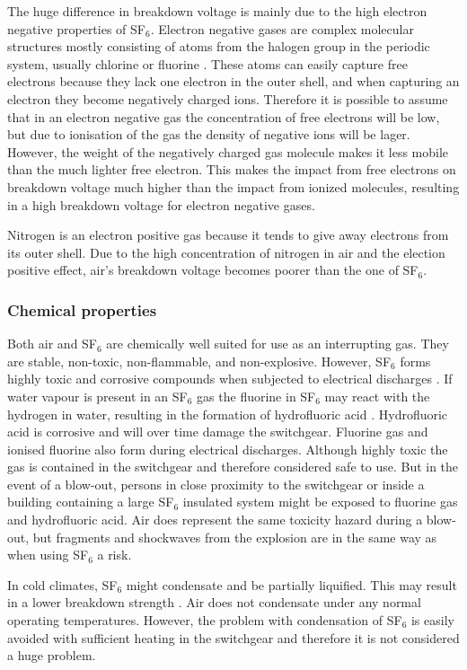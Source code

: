 \documentclass[10pt,a4paper]{article}
\begin{document}
The huge difference in breakdown voltage is mainly due to the high electron negative properties of SF$_6$. Electron negative gases are complex molecular structures mostly consisting of atoms from the halogen group in the periodic system, usually chlorine or fluorine \cite{bib:TET4160HVIM}. These atoms can easily capture free electrons because they lack one electron in the outer shell, and when capturing an electron they become negatively charged ions. Therefore it is possible to assume that in an electron negative gas the concentration of free electrons will be low, but due to ionisation of the gas the density of negative ions will be lager. However, the weight of the negatively charged gas molecule makes it less mobile than the much lighter free electron. This makes the impact from free electrons on breakdown voltage much higher than the impact from ionized molecules, resulting in a high breakdown voltage for electron negative gases.

Nitrogen is an electron positive gas because it tends to give away electrons from its outer shell. Due to the high concentration of nitrogen in air and the election positive effect, air's breakdown voltage becomes poorer than the one of SF$_6$.

\subsubsection*{Chemical properties}
Both air and SF$_6$ are chemically well suited for use as an interrupting gas. They are stable, non-toxic, non-flammable, and non-explosive. However, SF$_6$ forms highly toxic and corrosive compounds when subjected to electrical discharges \cite{bib:SF6PI}. If water vapour is present in an SF$_6$ gas the fluorine in SF$_6$ may react with the hydrogen in water, resulting in the formation of hydrofluoric acid \cite{bib:SF6PI}. Hydrofluoric acid is corrosive and will over time damage the switchgear. Fluorine gas and ionised fluorine also form during electrical discharges. Although highly toxic the gas is contained in the switchgear and therefore considered safe to use. But in the event of a blow-out, persons in close proximity to the switchgear or inside a building containing a large SF$_6$ insulated system might be exposed to fluorine gas and hydrofluoric acid. Air does represent the same toxicity hazard during a blow-out, but fragments and shockwaves from the explosion are in the same way as when using SF$_6$ a risk.

In cold climates, SF$_6$ might condensate and be partially liquified. This may result in a lower breakdown strength \cite{bib:SF6PI}. Air does not condensate under any normal operating temperatures. However, the problem with condensation of SF$_6$ is easily avoided with sufficient heating in the switchgear and therefore it is not considered a huge problem.
\end{document}
